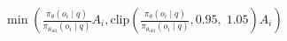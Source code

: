 \documentclass[preview]{standalone}
\begin{document}
\begin{align*}
\min \left(\frac{\pi_\theta(o_i \mid q)}{\pi_{\theta_{\text{old}}}(o_i \mid q)} A_i,\text{clip} \left(\frac{\pi_\theta(o_i \mid q)}{\pi_{\theta_{\text{old}}}(o_i \mid q)},0.95,\; 1.05\right) A_i\right)
\end{align*}
\end{document}
